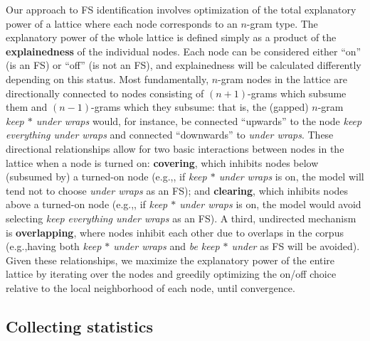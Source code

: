 \documentclass[11pt,letterpaper]{article}
\makeatletter
\def \eg {e.g.,\@ }
\newcommand{\gap}{$*$\xspace}
\newcommand{\ex}[1]{\textit{#1}\xspace}
\newcommand{\termdef}[1]{\textbf{#1}\xspace}
\makeatother
\begin{document}
Our approach to FS identification involves optimization of the total explanatory power of a lattice where each node corresponds to an $n$-gram type. The explanatory power of the whole lattice is defined simply as a product of the \termdef{explainedness} of the individual nodes. Each node can be considered either ``on'' (is an FS) or ``off'' (is not an FS), and explainedness will be calculated differently depending on this status. Most fundamentally, $n$-gram nodes in the lattice are directionally connected to nodes consisting of $(n+1)$-grams which subsume them and $(n-1)$-grams which they subsume: that is, the (gapped) $n$-gram \ex{keep \gap under wraps} would, for instance, be connected ``upwards'' to the node \ex{keep everything under wraps} and connected ``downwards'' to \ex{under wraps}. These directional relationships allow for two basic interactions between nodes in the lattice when a node is turned on: \termdef{covering}, which inhibits nodes below (subsumed by) a turned-on node (\eg, if \ex{keep \gap under wraps} is on, the model will tend not to choose \ex{under wraps} as an FS); and \termdef{clearing}, which inhibits nodes above a turned-on node (\eg, if \ex{keep \gap under wraps} is on, the model would avoid selecting \ex{keep everything under wraps} as an FS). A third, undirected mechanism is \termdef{overlapping}, where nodes inhibit each other due to overlaps in the corpus (\eg having both \ex{keep \gap under wraps} and \ex{be keep \gap under} as FS will be avoided). Given these relationships, we maximize the explanatory power of the entire lattice by iterating over the nodes and greedily optimizing the on/off choice relative to the local neighborhood of each node, until convergence.

\subsection{Collecting statistics}
\end{document}
